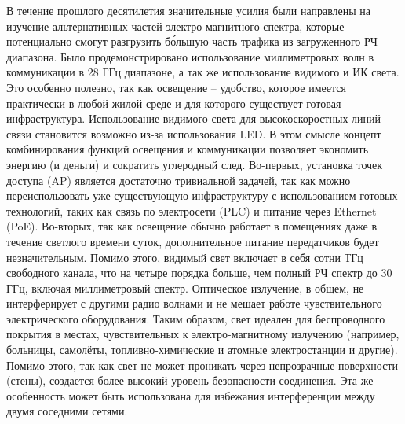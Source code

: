 В течение прошлого десятилетия значительные усилия были направлены на изучение альтернативных частей электро-магнитного спектра, которые потенциально смогут разгрузить б\'ольшую часть трафика из загруженного РЧ диапазона. Было продемонстрировано использование миллиметровых волн в коммуникации в 28 ГГц  диапазоне, а так же использование видимого и ИК света. Это особенно полезно, так как освещение \--- удобство, которое имеется практически в любой жилой среде и для которого существует готовая инфраструктура. Использование видимого света для высокоскоростных линий связи становится возможно из-за использования LED. В этом смысле концепт комбинирования функций освещения и коммуникации позволяет экономить энергию (и деньги) и сократить углеродный след. Во-первых, установка точек доступа (AP) является достаточно тривиальной задачей, так как можно переиспользовать уже существующую инфраструктуру с использованием готовых технологий, таких как связь по электросети (PLC) и питание через Ethernet (PoE). Во-вторых, так как освещение обычно работает в помещениях даже в течение светлого времени суток, дополнительное питание передатчиков будет незначительным. Помимо этого, видимый свет включает в себя сотни ТГц свободного канала, что на четыре порядка больше, чем полный РЧ спектр до 30 ГГц, включая миллиметровый спектр. Оптическое излучение, в общем, не интерферирует с другими радио волнами и не мешает работе чувствительного электрического оборудования. Таким образом, свет идеален для беспроводного покрытия в местах, чувствительных к электро-магнитному излучению (например, больницы, самолёты, топливно-химические и атомные электростанции и другие). Помимо этого, так как свет не может проникать через непрозрачные поверхности (стены), создается более высокий уровень безопасности соединения. Эта же особенность может быть использована для избежания интерференции между двумя соседними сетями.


